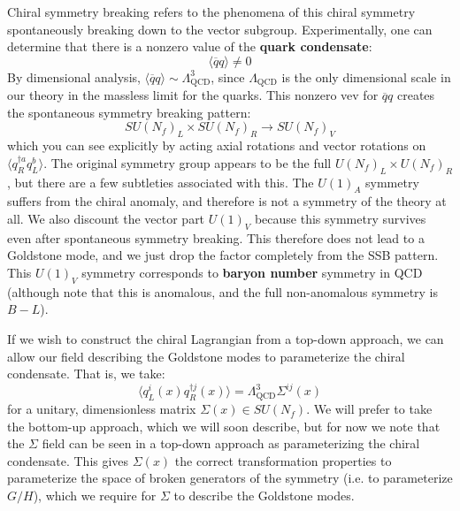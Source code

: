 \documentclass[11pt, oneside]{article}   	%
\theoremstyle{definition}
\numberwithin{equation}{subsection}		%
\begin{document}
Chiral symmetry breaking refers to the phenomena of this chiral symmetry spontaneously breaking down to the vector subgroup. 
Experimentally, one can determine that there is a nonzero value of the \textbf{quark condensate}:
\begin{equation}
	\langle\overline q q\rangle\neq 0
\end{equation}
By dimensional analysis, $\langle\overline q q \rangle\sim \Lambda_\mathrm{QCD}^3$, since $\Lambda_\mathrm{QCD}$ is the only 
dimensional scale in our theory in the massless limit for the quarks. This nonzero vev for $\overline q q$ creates the spontaneous 
symmetry breaking pattern:
\begin{equation}
	SU(N_f)_L\times SU(N_f)_R\rightarrow SU(N_f)_V
\end{equation}
which you can see explicitly by acting axial rotations and vector rotations on $\langle q^{\dagger a}_R q_L^b\rangle$. 
The original symmetry group appears to be the full $U(N_f)_L\times U(N_f)_R$, but there are a few subtleties associated with this. 
The $U(1)_A$ symmetry suffers from the chiral anomaly, and therefore is not a symmetry of the theory at all. We also discount the vector 
part $U(1)_V$ because this symmetry survives even after spontaneous symmetry breaking. This therefore does not lead to a Goldstone 
mode, and we just drop the factor completely from the SSB pattern. This $U(1)_V$ symmetry corresponds to \textbf{baryon number} 
symmetry in QCD (although note that this is anomalous, and the full non-anomalous symmetry is $B - L$). 

If we wish to construct the chiral Lagrangian from a top-down approach, we can allow our field describing the Goldstone modes to 
parameterize the chiral condensate. That is, we take:
\begin{equation}
	\langle q_L^i(x) q_R^{\dagger j}(x)\rangle = \Lambda_\mathrm{QCD}^3\Sigma^{ij}(x)
\end{equation}
for a unitary, dimensionless matrix $\Sigma(x)\in SU(N_f)$. We will prefer to take the bottom-up approach, which we will soon describe, 
but for now we note that the $\Sigma$ field can be seen in a top-down approach as parameterizing the chiral condensate. This gives 
$\Sigma(x)$ the correct transformation properties to parameterize the space of broken generators of the symmetry (i.e. to parameterize 
$G / H$), which we require for $\Sigma$ to describe the Goldstone modes. 
\end{document}
